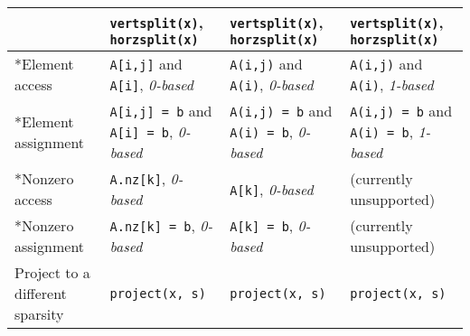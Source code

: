 \documentclass[a4paper,12pt]{book}
\begin{document}
\begin{center}
\begin{tabular}{| p{3.5cm} | p{3.5cm} | p{3.5cm} | p{3.5cm} | }
    & \verb|vertsplit(x)|, \verb|horzsplit(x)| & \verb|vertsplit(x)|, \verb|horzsplit(x)| & \verb|vertsplit(x)|, \verb|horzsplit(x)| \\ \hline
    *Element access
    & \verb|A[i,j]| and \verb|A[i]|, \linebreak \emph{0-based}
    & \verb|A(i,j)| and \verb|A(i)|, \linebreak \emph{0-based}
    & \verb|A(i,j)| and \verb|A(i)|, \linebreak \emph{1-based} \\ \hline
    *Element assignment
    & \verb|A[i,j] = b| and \verb|A[i] = b|, \linebreak \emph{0-based}
    & \verb|A(i,j) = b| and \verb|A(i) = b|, \linebreak \emph{0-based}
    & \verb|A(i,j) = b| and \verb|A(i) = b|, \linebreak \emph{1-based} \\ \hline
    *Nonzero access
    & \verb|A.nz[k]|, \emph{0-based}
    & \verb|A[k]|, \emph{0-based}
    & (currently unsupported) \\ \hline
    *Nonzero assignment
    & \verb|A.nz[k] = b|, \emph{0-based}
    & \verb|A[k] = b|, \emph{0-based}
    & (currently unsupported) \\ \hline
    Project to a different sparsity
    & \verb|project(x, s)| & \verb|project(x, s)| & \verb|project(x, s)| \\ \hline
  \end{tabular}
\end{center}

%
%
\end{document}

